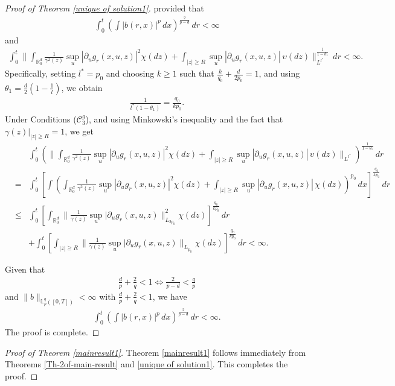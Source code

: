 \documentclass[12pt,oneside, reqno]{amsart}
\newcommand{\ce}{\begin{eqnarray*}}
\newcommand{\de}{\end{eqnarray*}}
\def\mL{{\mathbb L}}
\def\mR{{\mathbb R}}
\def\sC{{\mathscr C}}
\def\geq{\geqslant}
\def\leq{\leqslant}
\numberwithin{equation}{section}
\begin{document}
\begin{proof}[Proof of Theorem \ref{unique of solution1}]
provided that
\ce 
\int_0^t \left(\int |b(r,x)|^p \,dx\right)^{\frac{2}{p-d}}\,dr<\infty
\de 
and 
\ce 
\int_0^t\big\|\int_{\mR^d_0}\frac{1}{\gamma^2(z)}\sup_u|\partial_u  g_{r}(x,u,z)|^2\chi(dz)+\int_{|z|\geq R}\sup_u|\partial_u  g_{r}(x,u,z)|\,\upsilon(dz)\big\|_{L^{l^*}}^{\frac{1}{1-\theta_1}}\,dr<\infty.
\de 
Specifically, setting 
 $l^*=p_0$ and choosing 
 $k\geq 1$  such that  $\frac{k}{q_0}+\frac{d}{2p_0}=1$, and using $\theta_1=\frac{d}{2}\left(1-\frac{1}{l}\right)$, we obtain
\ce 
\frac{1}{l^*(1-\theta_1)}=\frac{q_0}{kp_0}.
\de 
Under Conditions ($\sC_3^g$), and using  Minkowski's inequality and the fact that $\gamma(z)|_{|z|\geq R}=1$, we get 
\ce 
&&\int_0^t\left(\|\int_{\mR^d_0}\frac{1}{\gamma^2(z)}\sup_u|\partial_u  g_{r}(x,u,z)|^2\chi(dz)+\int_{|z|\geq R}\sup_u|\partial_u  g_{r}(x,u,z)|\,\upsilon(dz)\|_{L^{l^*}}\right)^{\frac{1}{1-\theta_1}}\,dr\\
&=&\int_0^t\left[\int\left(\int_{\mR^d_0}\frac{1}{\gamma^2(z)}\sup_u|\partial_u  g_{r}(x,u,z)|^2\chi(dz)+\int_{|z|\geq R}\sup_u|\partial_u  g_{r}(x,u,z)|\,\chi(dz)\right)^{p_0}\,dx\right]^{\frac{q_0}{kp_0}}\,dr\\
&\leq &\int_0^t\left[\int_{\mR^d_0}\|\frac{1}{\gamma(z)}\sup_u|\partial_u  g_{r}(x,u,z)\|_{L_{2p_0}}^{2}\chi(dz)\right]^{\frac{q_0}{kp_0}}\,dr\\
&&+\int_0^t\left[\int_{|z|\geq R}\|\frac{1}{\gamma(z)}\sup_u|\partial_u  g_{r}(x,u,z)\|_{L_{p_0}}\chi(dz)\right]^{\frac{q_0}{kp_0}}\,dr<\infty.
\de

Given that
\ce 
\frac{d}{p}+\frac{2}{q}<1\Leftrightarrow \frac{2}{p-d}<\frac{q}{p}
\de 
and 
$\|b\|_{\mL_p^q([0,T])}<\infty$ with $\frac{d}{p}+\frac{2}{q}<1$, 
we  have 
\ce 
\int_0^t \left(\int |b(r,x)|^p \,dx\right)^{\frac{2}{p-d}}\,dr<\infty.
\de 
The proof is complete.
\end{proof}

\begin{proof}[Proof of Theorem \ref{mainresult1}]
Theorem \ref{mainresult1} follows immediately from Theorems \ref{Th-2of-main-result} and  \ref{unique of solution1}. This completes the proof.
\end{proof}

\end{document}

